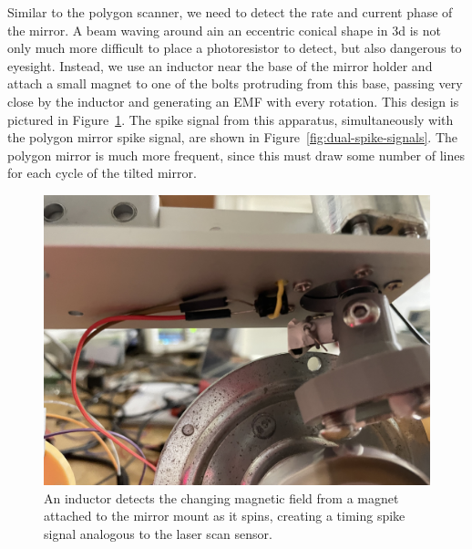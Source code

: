 \documentclass[twocolumn]{revtex4-2}
\begin{document}
Similar to the polygon scanner, we need to detect the rate and current phase of the mirror. A beam waving around ain an eccentric conical shape in 3d is not only much more difficult to place a photoresistor to detect, but also dangerous to eyesight. Instead, we use an inductor near the base of the mirror holder and attach a small magnet to one of the bolts protruding from this base, passing very close by the inductor and generating an EMF with every rotation. This design is pictured in Figure~\ref{fig:tilt-mirror-sensor}. The spike signal from this apparatus, simultaneously with the polygon mirror spike signal, are shown in Figure~\ref{fig:dual-spike-signals}. The polygon mirror is much more frequent, since this must draw some number of lines for each cycle of the tilted mirror. 


\begin{figure}
    \centering
    \includegraphics[width=0.95\linewidth]{tilt-mirror-sensor.jpeg}
    \caption[Tilted Mirror Rotation Sensor]{An inductor detects the changing magnetic field from a magnet attached to the mirror mount as it spins, creating a timing spike signal analogous to the laser scan sensor.}
    \label{fig:tilt-mirror-sensor}
\end{figure}
\end{document}
